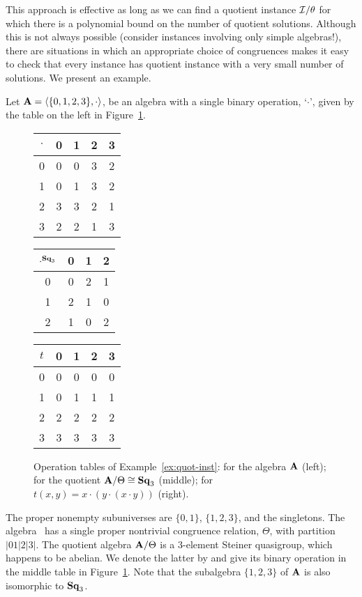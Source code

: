 This approach is effective as long as we can find a quotient instance
$\mathcal{I}/\theta$ for which there is a polynomial bound on the number of
quotient solutions.
Although this is not always possible (consider instances involving only simple algebras!),
there are situations in which an appropriate choice of congruences makes
it easy to check that every instance has quotient instance with a very small
number of solutions.  We present an example.

\begin{example}\label{ex:quot-inst}
Let $\mathbf{A} = \langle\{0,1,2,3\}, \cdot \rangle$, be an algebra with a single binary operation, `$\cdot $', given by the table on the left in Figure~\ref{tab:final-4}.
\begin{figure}
\centering
 \begin{tabular}{c|cccc}
      $\cdot $ & 0 & 1 & 2 & 3\\
      \hline
      0 & 0 & 0 & 3& 2\\
      1 & 0 & 1 & 3& 2\\
      2 & 3 & 3 & 2 & 1\\
      3 & 2 & 2 & 1 & 3
 \end{tabular}
 \hskip1cm
  \begin{tabular}{c|ccc}
   $\cdot^{\mathbf{Sq}_{3}}$&0&1&2\\
  \hline
  0&0&2&1\\
  1&2&1&0\\
  2&1&0&2
  \end{tabular}
 \hskip1cm
  \begin{tabular}{c|cccc}
      $t$ & 0 & 1 & 2 & 3\\
      \hline
      0 & 0 & 0 & 0& 0\\
      1 & 0 & 1 & 1& 1\\
      2 & 2 & 2 & 2 & 2\\
      3 & 3 & 3 & 3 & 3
    \end{tabular}
  \caption{Operation tables of Example~\ref{ex:quot-inst}:
    for the algebra $\mathbf{A}$ (left);
    for the quotient $\mathbf{A}/\Theta \cong \mathbf{Sq}_{3}$ (middle); 
    for $t(x,y) = x\cdot (y\cdot (x\cdot y))$ (right).}
  \label{tab:final-4}
\end{figure}
The proper nonempty subuniverses are
$\{0,1\}$, $\{1,2,3\}$, and the singletons.
The algebra \bA\ has a single proper nontrivial congruence relation, $\Theta$, with partition $|01|2|3|$. 
The quotient algebra $\mathbf{A}/\Theta$ is a 3-element Steiner quasigroup, which happens to be abelian.
We denote the latter by  and give its binary operation
in the middle table in Figure~\ref{tab:final-4}.
Note that the subalgebra $\{1,2,3\}$ of $\mathbf{A}$ is also isomorphic to $\mathbf{Sq}_{3}$. 


\end{example}
